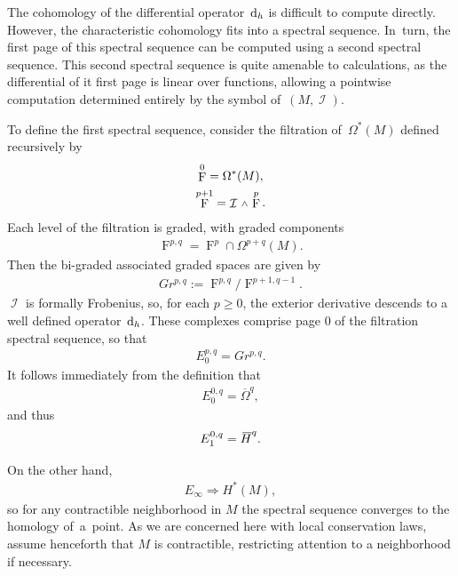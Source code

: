 \documentclass[pdftex]{sigma}
\DeclareMathOperator{\I}{\mathcal{I}}
\renewcommand{\d}{{\rm d}}
\newcommand{\w}{{\mathchoice{\,{\scriptstyle\wedge}\,}{{\scriptstyle\wedge}}
 {{\scriptscriptstyle\wedge}}{{\scriptscriptstyle\wedge}}}}
\DeclareMathOperator{\pwf}{F}
\renewcommand{\dh}{\ensuremath{\hspace{1pt} \d_h}}
\newcommand{\barh}[1]{{}\mkern3mu\overline{\mkern-3mu H}^{#1}}
\newcommand{\Omegabar}{\overline{\Omega}}
\numberwithin{equation}{section}
\begin{document}
The cohomology of the differential operator $\dh$ is difficult to compute directly. However, the characteristic cohomology fits into a spectral sequence. In~turn, the first page of this spectral sequence can be computed using a second spectral sequence. This second spectral sequence is quite amenable to calculations, as the differential of it first page is linear over functions, allowing a pointwise computation determined entirely by the symbol of~$(M,\I)$.

To define the first spectral sequence, consider the filtration of~$\Omega^*(M)$ defined recursively by
\begin{gather*}
 \pwf^0 = \Omega^*(M), \\
 \pwf^{p+1} = \I\w \pwf^p .
\end{gather*}
Each level of the filtration is graded, with graded components
\begin{gather*}
\pwf^{p,q} = \pwf^p \cap \Omega^{p+q}(M) .
\end{gather*}
Then the bi-graded associated graded spaces are given by
\begin{gather*}
Gr^{p,q} := \pwf^{p,q}/\pwf^{p+1,q-1}.
\end{gather*}
$\I$ is formally Frobenius, so, for each $p\ge 0$, the exterior derivative descends to a well defined operator $\dh$. These complexes comprise page 0 of the filtration spectral sequence, so that
\begin{gather*}
E^{p,q}_0 = Gr^{p,q} .
\end{gather*}
It follows immediately from the definition that
\begin{gather*}
E^{0,q}_0 = \Omegabar^q ,
\end{gather*}
and thus
\begin{gather*}
E^{0,q}_1 = \barh{q} .
\end{gather*}

On the other hand,
\begin{gather*}
E_\infty \Rightarrow H^*(M) ,
\end{gather*}
so for any contractible neighborhood in $M$ the spectral sequence converges to the homology of~a~point. As we are concerned here with local conservation laws, assume henceforth that $M$ is contractible, restricting attention to a neighborhood if necessary.
\end{document}
